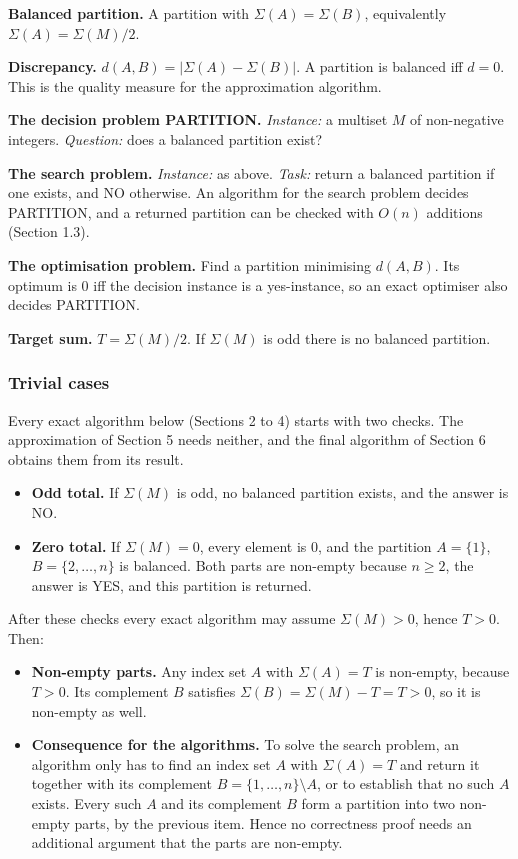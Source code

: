 \documentclass[
]{article}
\providecommand{\tightlist}{%
  \setlength{\itemsep}{0pt}\setlength{\parskip}{0pt}}
\begin{document}
\textbf{Balanced partition.} A partition with \(\Sigma(A) = \Sigma(B)\),
equivalently \(\Sigma(A) = \Sigma(M)/2\).

\textbf{Discrepancy.} \(d(A,B) = |\Sigma(A) - \Sigma(B)|\). A partition
is balanced iff \(d = 0\). This is the quality measure for the
approximation algorithm.

\textbf{The decision problem PARTITION.} \emph{Instance:} a multiset
\(M\) of non-negative integers. \emph{Question:} does a balanced
partition exist?

\textbf{The search problem.} \emph{Instance:} as above. \emph{Task:}
return a balanced partition if one exists, and NO otherwise. An
algorithm for the search problem decides PARTITION, and a returned
partition can be checked with \(O(n)\) additions (Section 1.3).

\textbf{The optimisation problem.} Find a partition minimising
\(d(A,B)\). Its optimum is \(0\) iff the decision instance is a
yes-instance, so an exact optimiser also decides PARTITION.

\textbf{Target sum.} \(T = \Sigma(M)/2\). If \(\Sigma(M)\) is odd there
is no balanced partition.

\hypertarget{trivial-cases}{%
\subsubsection{Trivial cases}\label{trivial-cases}}

Every exact algorithm below (Sections 2 to 4) starts with two checks.
The approximation of Section 5 needs neither, and the final algorithm of
Section 6 obtains them from its result.

\begin{itemize}
\tightlist
\item
  \textbf{Odd total.} If \(\Sigma(M)\) is odd, no balanced partition
  exists, and the answer is NO.
\item
  \textbf{Zero total.} If \(\Sigma(M) = 0\), every element is \(0\), and
  the partition \(A = \{1\}\), \(B = \{2, \dots, n\}\) is balanced. Both
  parts are non-empty because \(n \ge 2\), the answer is YES, and this
  partition is returned.
\end{itemize}

After these checks every exact algorithm may assume \(\Sigma(M) > 0\),
hence \(T > 0\). Then:

\begin{itemize}
\tightlist
\item
  \textbf{Non-empty parts.} Any index set \(A\) with \(\Sigma(A) = T\)
  is non-empty, because \(T > 0\). Its complement \(B\) satisfies
  \(\Sigma(B) = \Sigma(M) - T = T > 0\), so it is non-empty as well.
\item
  \textbf{Consequence for the algorithms.} To solve the search problem,
  an algorithm only has to find an index set \(A\) with
  \(\Sigma(A) = T\) and return it together with its complement
  \(B = \{1, \dots, n\} \setminus A\), or to establish that no such
  \(A\) exists. Every such \(A\) and its complement \(B\) form a
  partition into two non-empty parts, by the previous item. Hence no
  correctness proof needs an additional argument that the parts are
  non-empty.
\end{itemize}
\end{document}
